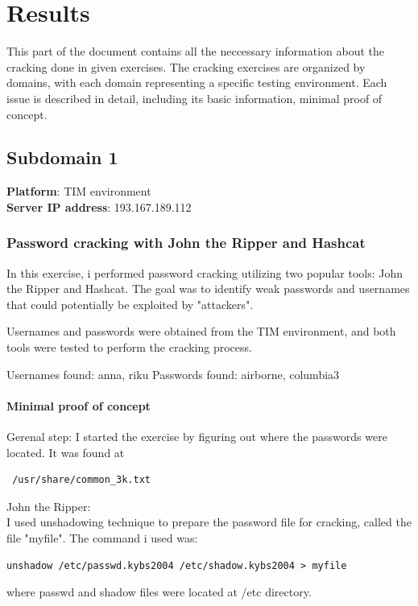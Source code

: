 \chapter{Results}
This part of the document contains all the neccessary information about the cracking done in given exercises.
The cracking exercises are organized by domains, with each domain representing a specific testing environment. Each issue is described in detail, 
including its basic information, minimal proof of concept.


\section{Subdomain 1}
\textbf{Platform}: TIM environment\\
\textbf{Server IP address}: 193.167.189.112

\subsection{Password cracking with John the Ripper and Hashcat} \label{ss: issue-1}
In this exercise, i performed password cracking utilizing two popular tools: John the Ripper and Hashcat. 
The goal was to identify weak passwords and usernames that could potentially be exploited by "attackers".

Usernames and passwords were obtained from the TIM environment, and both tools were tested 
to perform the cracking process.

Usernames found: anna, riku
Passwords found: airborne, columbia3

\subsubsection{Minimal proof of concept}
Gerenal step:
I started the exercise by figuring out where the passwords were located. It was found at
\begin{verbatim} /usr/share/common_3k.txt \end{verbatim}

John the Ripper: \\
I used unshadowing technique to prepare the password file for cracking, called the file "myfile". 
The command i used was: 
\begin{verbatim}
unshadow /etc/passwd.kybs2004 /etc/shadow.kybs2004 > myfile
\end{verbatim}
where passwd and shadow files were located at /etc directory.

